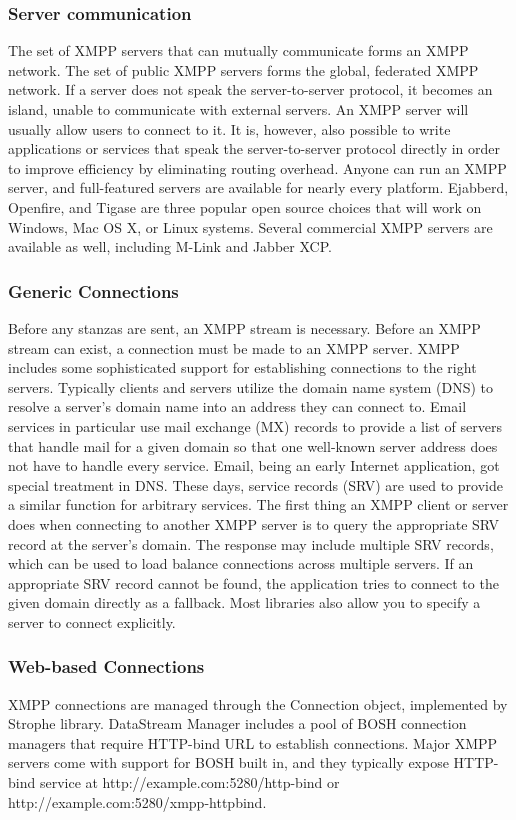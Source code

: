     \subsubsection{Server communication}
	The set of XMPP servers that can mutually communicate forms an XMPP network. The set of public XMPP servers forms the global, federated XMPP network. If a server does not speak the server-to-server protocol, it becomes an island, unable to communicate with external servers. An XMPP server will usually allow users to connect to it. It is, however, also possible to write applications or services that speak the server-to-server protocol directly in order to improve efficiency by eliminating routing overhead. Anyone can run an XMPP server, and full-featured servers are available for nearly every platform. Ejabberd, Openfire, and Tigase are three popular open source choices that will work on Windows, Mac OS X, or Linux systems. Several commercial XMPP servers are available as well, including M-Link and Jabber XCP.
	
	\subsubsection{Generic Connections}
	Before any stanzas are sent, an XMPP stream is necessary. Before an XMPP stream can exist, a connection must be made to an XMPP server. XMPP includes some sophisticated support for establishing connections to the right servers. Typically clients and servers utilize the domain name system (DNS) to resolve a server's domain name into an address they can connect to. Email services in particular use mail exchange (MX) records to provide a list of servers that handle mail for a given domain so that one well-known server address does not have to handle every service. Email, being an early Internet application, got special treatment in DNS. These days, service records (SRV) are used to provide a similar function for arbitrary services. The first thing an XMPP client or server does when connecting to another XMPP server is to query the appropriate SRV record at the server’s domain. The response may include multiple SRV records, which can be used to load balance connections across multiple servers. If an appropriate SRV record cannot be found, the application tries to connect to the given domain directly as a fallback. Most libraries also allow you to specify a server to connect explicitly.

	\subsubsection{Web-based Connections}
	XMPP connections are managed through the Connection object, implemented by Strophe library. DataStream Manager includes a pool of BOSH connection managers that require HTTP-bind URL to establish connections. Major XMPP servers come with support for BOSH built in, and they typically expose HTTP-bind service at http://example.com:5280/http-bind or http://example.com:5280/xmpp-httpbind.

